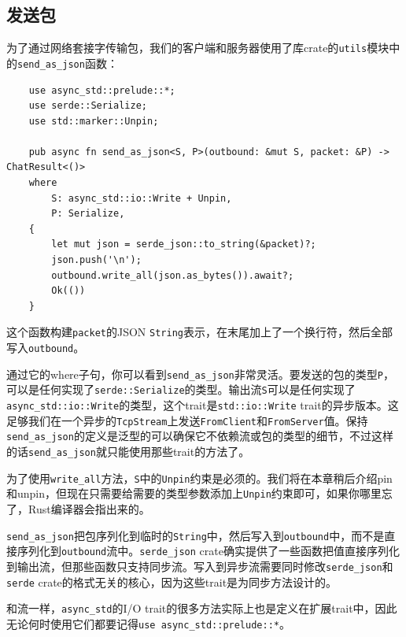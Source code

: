 \subsection{发送包}
为了通过网络套接字传输包，我们的客户端和服务器使用了库crate的\texttt{utils}模块中的\texttt{send\_as\_json}函数：
\begin{verbatim}
    use async_std::prelude::*;
    use serde::Serialize;
    use std::marker::Unpin;

    pub async fn send_as_json<S, P>(outbound: &mut S, packet: &P) -> ChatResult<()>
    where
        S: async_std::io::Write + Unpin,
        P: Serialize,
    {
        let mut json = serde_json::to_string(&packet)?;
        json.push('\n');
        outbound.write_all(json.as_bytes()).await?;
        Ok(())
    }
\end{verbatim}

这个函数构建\texttt{packet}的JSON \texttt{String}表示，在末尾加上了一个换行符，然后全部写入\texttt{outbound}。

通过它的where子句，你可以看到\texttt{send\_as\_json}非常灵活。要发送的包的类型\texttt{P}，可以是任何实现了\texttt{serde::Serialize}的类型。输出流\texttt{S}可以是任何实现了\texttt{async\_std::io::Write}的类型，这个trait是\texttt{std::io::Write} trait的异步版本。这足够我们在一个异步的\texttt{TcpStream}上发送\texttt{FromClient}和\texttt{FromServer}值。保持\texttt{send\_as\_json}的定义是泛型的可以确保它不依赖流或包的类型的细节，不过这样的话\texttt{send\_as\_json}就只能使用那些trait的方法了。

为了使用\texttt{write\_all}方法，\texttt{S}中的\texttt{Unpin}约束是必须的。我们将在本章稍后介绍pin和unpin，但现在只需要给需要的类型参数添加上\texttt{Unpin}约束即可，如果你哪里忘了，Rust编译器会指出来的。

\texttt{send\_as\_json}把包序列化到临时的\texttt{String}中，然后写入到\texttt{outbound}中，而不是直接序列化到\texttt{outbound}流中。\texttt{serde\_json} crate确实提供了一些函数把值直接序列化到输出流，但那些函数只支持同步流。写入到异步流需要同时修改\texttt{serde\_json}和\texttt{serde} crate的格式无关的核心，因为这些trait是为同步方法设计的。

和流一样，\texttt{async\_std}的I/O trait的很多方法实际上也是定义在扩展trait中，因此无论何时使用它们都要记得\texttt{use async\_std::prelude::*}。

